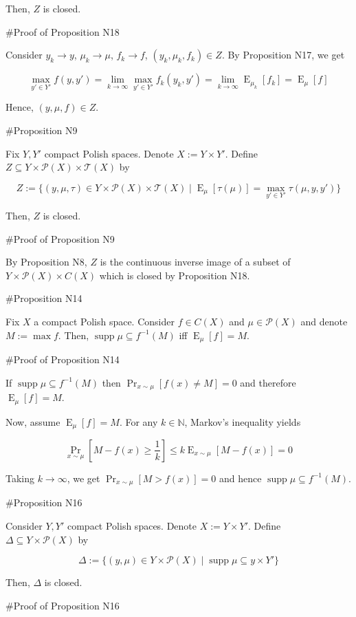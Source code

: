 \documentclass[a4paper]{article}
\DeclareMathOperator{\Supp}{supp}
\DeclareMathOperator{\Prb}{Pr}
\DeclareMathOperator{\E}{E}
\newcommand{\Nats}{\mathbb{N}}
\newcommand{\Prob}{\mathcal{P}}
\newcommand{\T}{\mathcal{T}}
\begin{document}
Then, ${Z}$ is closed.

\#Proof of Proposition N18

Consider ${y_k \rightarrow y}$, ${\mu_k \rightarrow \mu}$, ${f_k \rightarrow f}$, ${(y_k,\mu_k,f_k) \in Z}$. By Proposition N17, we get

$$\max_{y' \in Y'} f(y,y') = \lim_{k \rightarrow \infty} \max_{y' \in Y'} f_k(y_k,y')= \lim_{k \rightarrow \infty} \E_{\mu_k}[f_k] = \E_{\mu}[f]$$

Hence, ${(y,\mu,f) \in Z}$.

\#Proposition N9

Fix ${Y,Y'}$ compact Polish spaces. Denote ${X:=Y \times Y'}$. Define ${Z \subseteq Y \times \Prob(X) \times \T(X)}$ by

$$Z:=\{(y,\mu,\tau) \in Y \times \Prob(X) \times \T(X) \mid \E_\mu[\tau(\mu)] = \max_{y' \in Y'} \tau(\mu,y,y')\}$$

Then, ${Z}$ is closed.

\#Proof of Proposition N9

By Proposition N8, ${Z}$ is the continuous inverse image of a subset of ${Y \times \Prob(X) \times C(X)}$ which is closed by Proposition N18.

\#Proposition N14

Fix ${X}$ a compact Polish space. Consider ${f \in C(X)}$ and ${\mu \in \Prob(X)}$ and denote ${M := \max f}$. Then, ${\Supp \mu \subseteq f^{-1}(M)}$ iff ${\E_\mu[f] = M}$.

\#Proof of Proposition N14

If ${\Supp \mu \subseteq f^{-1}(M)}$ then $\Prb_{x\sim \mu}[f(x) \ne M] = 0$ and therefore ${\E_\mu[f] = M}$.

Now, assume ${\E_\mu[f] = M}$. For any ${k \in \Nats}$, Markov's inequality yields 

$$\Prb_{x\sim \mu}[M - f(x) \geq \frac{1}{k}] \leq k\E_{x \sim \mu}[M - f(x)] = 0$$

Taking $k \rightarrow \infty$, we get ${\Prb_{x\sim \mu}[M > f(x)] = 0}$ and hence ${\Supp \mu \subseteq f^{-1}(M)}$.

\#Proposition N16

Consider ${Y,Y'}$ compact Polish spaces. Denote ${X:=Y \times Y'}$. Define ${\Delta \subseteq Y \times \Prob(X)}$ by

$$\Delta:=\{(y,\mu) \in Y \times \Prob(X) \mid \Supp \mu \subseteq y \times Y'\}$$

Then, ${\Delta}$ is closed.

\#Proof of Proposition N16
\end{document}
